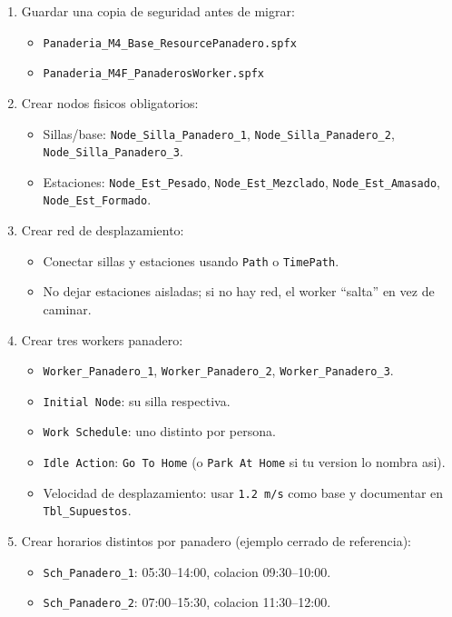 \documentclass[11pt]{article}
\newcommand{\simio}[1]{\texttt{#1}}
\newcommand{\tabla}[1]{\texttt{#1}}
\newcommand{\state}[1]{\texttt{#1}}
\begin{document}
\begin{enumerate}
  \item Guardar una copia de seguridad antes de migrar:
  \begin{itemize}
    \item \simio{Panaderia\_M4\_Base\_ResourcePanadero.spfx}
    \item \simio{Panaderia\_M4F\_PanaderosWorker.spfx}
  \end{itemize}
  \item Crear nodos fisicos obligatorios:
  \begin{itemize}
    \item Sillas/base: \simio{Node\_Silla\_Panadero\_1}, \simio{Node\_Silla\_Panadero\_2}, \simio{Node\_Silla\_Panadero\_3}.
    \item Estaciones: \simio{Node\_Est\_Pesado}, \simio{Node\_Est\_Mezclado}, \simio{Node\_Est\_Amasado}, \simio{Node\_Est\_Formado}.
  \end{itemize}
  \item Crear red de desplazamiento:
  \begin{itemize}
    \item Conectar sillas y estaciones usando \simio{Path} o \simio{TimePath}.
    \item No dejar estaciones aisladas; si no hay red, el worker ``salta'' en vez de caminar.
  \end{itemize}
  \item Crear tres workers panadero:
  \begin{itemize}
    \item \simio{Worker\_Panadero\_1}, \simio{Worker\_Panadero\_2}, \simio{Worker\_Panadero\_3}.
    \item \simio{Initial Node}: su silla respectiva.
    \item \simio{Work Schedule}: uno distinto por persona.
    \item \simio{Idle Action}: \simio{Go To Home} (o \simio{Park At Home} si tu version lo nombra asi).
    \item Velocidad de desplazamiento: usar \state{1.2 m/s} como base y documentar en \tabla{Tbl\_Supuestos}.
  \end{itemize}
  \item Crear horarios distintos por panadero (ejemplo cerrado de referencia):
  \begin{itemize}
    \item \simio{Sch\_Panadero\_1}: 05:30--14:00, colacion 09:30--10:00.
    \item \simio{Sch\_Panadero\_2}: 07:00--15:30, colacion 11:30--12:00.

\end{itemize}
\end{enumerate}
\end{document}
